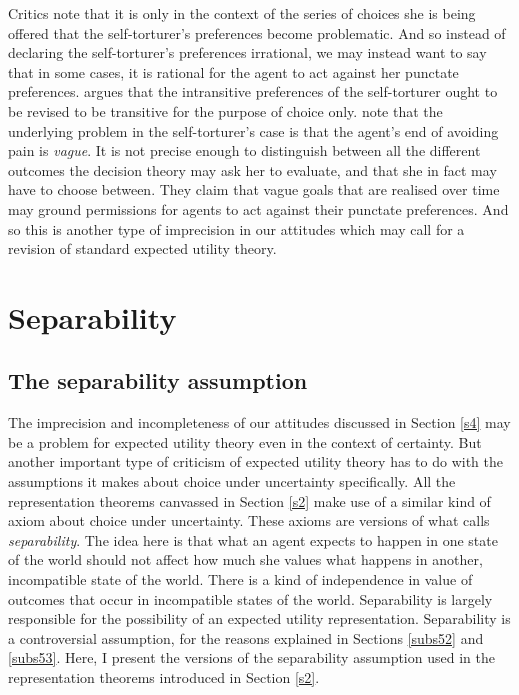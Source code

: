 Critics note that it is only in the context of the series of choices she is being offered that the self-torturer's preferences become problematic. And so instead of declaring the self-torturer's preferences irrational, we may instead want to say that in some cases, it is rational for the agent to act against her punctate preferences. \citet{Andreou2006} argues that the intransitive preferences of the self-torturer ought to be revised to be transitive for the purpose of choice only. \citet{TenenbaumRaffman2012} note that the underlying problem in the self-torturer's case is that the agent's end of avoiding pain is {\em vague}. It is not precise enough to distinguish between all the different outcomes the decision theory may ask her to evaluate, and that she in fact may have to choose between. They claim that vague goals that are realised over time may ground permissions for agents to act against their punctate preferences. And so this is another type of imprecision in our attitudes which may call for a revision of standard expected utility theory.

\section{Separability}\label{s5}

\subsection{The separability assumption}\label{subs51}

The imprecision and incompleteness of our attitudes discussed in Section \ref{s4} may be a problem for expected utility theory even in the context of certainty. But another important type of criticism of expected utility theory has to do with the assumptions it makes about choice under uncertainty specifically. All the representation theorems canvassed in Section \ref{s2} make use of a similar kind of axiom about choice under uncertainty. These axioms are versions of what \citet{Broome1991} calls {\em separability}. The idea here is that what an agent expects to happen in one state of the world should not affect how much she values what happens in another, incompatible state of the world. There is a kind of independence in value of outcomes that occur in incompatible states of the world. Separability is largely responsible for the possibility of an expected utility representation. Separability is a controversial assumption, for the reasons explained in Sections \ref{subs52} and \ref{subs53}. Here, I present the versions of the separability assumption used in the representation theorems introduced in Section \ref{s2}.


